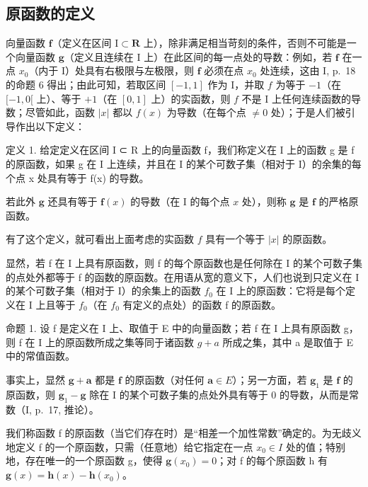 \subsection{原函数的定义}

向量函数 \(\mathbf{f}\)（定义在区间 \(\mathrm{I} \subset \mathbf{R}\) 上），除非满足相当苛刻的条件，否则不可能是一个向量函数 \(\mathbf{g}\)（定义且连续在 \(\mathrm{I}\) 上）在此区间的每一点处的导数：例如，若 \(\mathbf{f}\) 在一点 \(x_0\)（内于 \(\mathrm{I}\)）处具有右极限与左极限，则 \(\mathbf{f}\) 必须在点 \(x_0\) 处连续，这由 \(\mathrm{I}\), p.~18 的命题 6 得出；由此可知，若取区间 \([-1, 1]\) 作为 \(\mathrm{I}\)，并取 \(f\) 为等于 \(-1\)（在 \([-1, 0[\) 上）、等于 \(+1\)（在 \([0, 1]\) 上）的实函数，则 \(f\) 不是 \(\mathrm{I}\) 上任何连续函数的导数；尽管如此，函数 \(|x|\) 都以 \(f(x)\) 为导数（在每个点 \(\neq 0\) 处）；于是人们被引导作出以下定义：

定义 1. 给定定义在区间 I ⊂ R 上的向量函数 f，我们称定义在 I 上的函数 g 是 f 的原函数，如果 g 在 I 上连续，并且在 I 的某个可数子集（相对于 I）的余集的每个点 x 处具有等于 f(x) 的导数。

若此外 \(\mathbf{g}\) 还具有等于 \(\mathbf{f}(x)\) 的导数（在 I 的每个点 \(x\) 处），则称 \(\mathbf{g}\) 是 \(\mathbf{f}\) 的严格原函数。

有了这个定义，就可看出上面考虑的实函数 \(f\) 具有一个等于 \(|x|\) 的原函数。

显然，若 f 在 I 上具有原函数，则 f 的每个原函数也是任何除在 I 的某个可数子集的点处外都等于 f 的函数的原函数。在用语从宽的意义下，人们也说到只定义在 I 的某个可数子集（相对于 I）的余集上的函数 \(f_{0}\) 在 I 上的原函数：它将是每个定义在 I 上且等于 \(f_{0}\)（在 \(f_{0}\) 有定义的点处）的函数 f 的原函数。

命题 1. 设 f 是定义在 I 上、取值于 E 中的向量函数；若 f 在 I 上具有原函数 g，则 f 在 I 上的原函数所成之集等同于诸函数 \(g + a\) 所成之集，其中 a 是取值于 E 中的常值函数。

事实上，显然 \(\mathbf{g} + \mathbf{a}\) 都是 \(\mathbf{f}\) 的原函数（对任何 \(\mathbf{a} \in E\)）；另一方面，若 \(\mathbf{g}_1\) 是 \(\mathbf{f}\) 的原函数，则 \(\mathbf{g}_1 - \mathbf{g}\) 除在 I 的某个可数子集的点处外具有等于 0 的导数，从而是常数（I, p.~17, 推论）。

我们称函数 f 的原函数（当它们存在时）是“相差一个加性常数”确定的。为无歧义地定义 f 的一个原函数，只需（任意地）给它指定在一点 \(x_{0} \in I\) 处的值；特别地，存在唯一的一个原函数 g，使得 \(\mathbf{g}(x_{0}) = 0\)；对 f 的每个原函数 h 有 \(\mathbf{g}(x) = \mathbf{h}(x) - \mathbf{h}(x_{0})\)。

